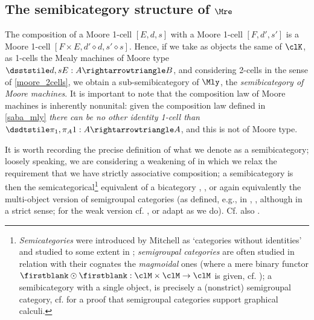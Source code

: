 \subsection{The semibicategory structure of $\Mre$}
\begin{corollary}
  \label{no_ids_never}
  The composition of a Moore 1-cell $[E,d,s]$ with a Moore 1-cell $[F,d',s']$ is a Moore 1-cell $[F\times E,d'\diamond d,s'\diamond s]$. Hence, if we take as objects the same of $\clK$, as 1-cells the Mealy machines of Moore type $\inMo Eds : A\mto B$, and considering 2-cells in the sense of \autoref{moore_2cells}, we obtain a sub-semibicategory of $\Mly$, the \emph{semibicategory of Moore machines}.
  It is important to note that the composition law of Moore machines is inherently nonunital: given the composition law defined in \autoref{saba_mly} \emph{there can be no other identity 1-cell than} $\inMe 1{\pi_1}{\pi_A} : A\mto A$, and this is not of Moore type.
\end{corollary}
It is worth recording the precise definition of what we denote as a semibicategory; loosely speaking, we are considering a weakening of \cite[Definition 1.1]{CTGDC_2002__43_3_163_0} in which we relax the requirement that we have strictly associative composition; a semibicategory is then the semicategorical\footnote{\emph{Semicategories} were introduced by Mitchell as `categories without identities' and studied to some extent in \cite{Mitchell1972}; \emph{semigroupal categories} are often studied in relation with their cognates the \emph{magmoidal} ones (where a mere binary functor $\firstblank\odot\firstblank : \clM\times\clM\to\clM$ is given, cf. \cite{Davydov2017nuclei}); a semibicategory with a single object, is precisely a (nonstrict) semigroupal category, cf. \cite{Lu_2018} for a proof that semigroupal categories support graphical calculi.} equivalent of a bicategory \cite{10.1007/BFb0074299}, \cite[I.3]{Gray1974}, or again equivalently the multi-object version of semigroupal categories (as defined, e.g., in \cite[3.3]{boyarchenko2007associativity}, \cite{Lu_2018}, although in a strict sense; for the weak version cf. \cite[4.1]{Elgueta2004}, or adapt \cite{CTGDC_2002__43_3_163_0} as we do). Cf. also \cite{KOCK2008,Kock2010}.
